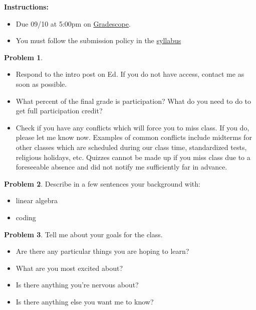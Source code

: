 \documentclass[12pt]{article}
\theoremstyle{definition}
\newtheorem{problem}{Problem}
\begin{document}
\textbf{\Large{}}
    
    \vspace{-1.8em}
    \hrulefill
 
\textbf{Instructions:}
    \begin{itemize}
        \item Due 09/10 at 5:00pm on \href{https://www.gradescope.com/courses/818054}{Gradescope}.
        \item You must follow the submission policy in the \href{https://courses.chen.pw/na_f2024/syllabus.html}{syllabus} 
\end{itemize}
   
\vspace{2em}

\begin{problem}
    ~
    \begin{itemize}
        \item Respond to the intro post on Ed. If you do not have access, contact me as soon as possible.
        \item What percent of the final grade is participation? What do you need to do to get full participation credit?
        \item Check if you have any conflicts which will force you to miss class. If you do, please let me know now.
            Examples of common conflicts include midterms for other classes which are scheduled during our class time, standardized tests, religious holidays, etc.
            Quizzes cannot be made up if you miss class due to a foreseeable absence and did not notify me sufficiently far in advance.
    \end{itemize}
\end{problem}

\begin{problem}
Describe in a few sentences your background with: 
    \begin{itemize}
        \item linear algebra
        \item coding
    \end{itemize}
\end{problem}

\begin{problem}
Tell me about your goals for the class.
    \begin{itemize}
        \item Are there any particular things you are hoping to learn? 
        \item What are you most excited about?
        \item Is there anything you're nervous about?
        \item Is there anything else you want me to know?
    \end{itemize}
\end{problem}
\end{document}
